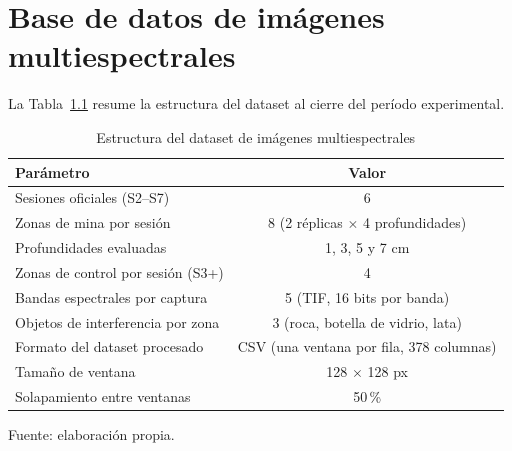 
\chapter{Base de datos de imágenes multiespectrales}
\label{anx:dataset}

La Tabla~\ref{tab:estructura_dataset} resume la estructura del dataset
al cierre del período experimental.

\begin{table}[H]
\centering
\caption{Estructura del dataset de imágenes multiespectrales}
\label{tab:estructura_dataset}
\begin{tabular}{lc}
\toprule
\textbf{Parámetro}                      & \textbf{Valor} \\
\midrule
Sesiones oficiales (S2--S7)    & 6 \\
Zonas de mina por sesión                & 8 (2 réplicas $\times$ 4 profundidades) \\
Profundidades evaluadas                 & 1, 3, 5 y 7 cm \\
Zonas de control por sesión (S3+)       & 4 \\
Bandas espectrales por captura          & 5 (TIF, 16 bits por banda) \\
Objetos de interferencia por zona       & 3 (roca, botella de vidrio, lata) \\
Formato del dataset procesado           & CSV (una ventana por fila, 378 columnas) \\
Tamaño de ventana                       & 128 $\times$ 128 px \\
Solapamiento entre ventanas             & 50\,\% \\
\bottomrule
\end{tabular}

  {\footnotesize Fuente: elaboración propia.}
\end{table}
